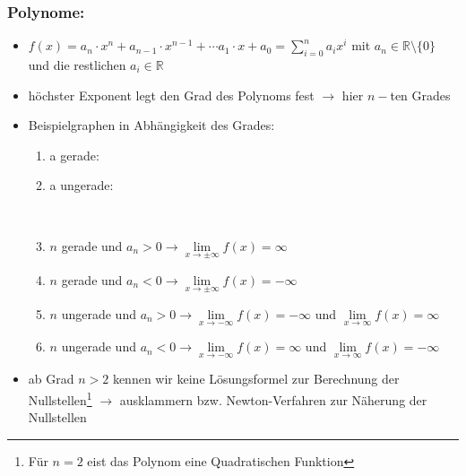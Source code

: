 \documentclass[a4paper,twocolumn,10pt]{onepgnote1}
\begin{document}
\subsubsection{Polynome:}
\begin{itemize}
\item $f(x)= a_n\cdot x^n + a_{n-1} \cdot x^{n-1} + \cdots a_1 \cdot x + a_0 =\sum\limits_{i=0}^{n} a_i x^i$ mit $a_n\in \mathds{R}\setminus \{0\}$ und die restlichen $a_{i} \in \mathds{R}$
\item höchster Exponent legt den Grad des Polynoms fest $\longrightarrow$ hier $n-$ten Grades
\item Beispielgraphen in Abhängigkeit des Grades:\\
\begin{enumerate}\item a gerade: 
\item a ungerade: \\
\item $n$ gerade und $a_n > 0 \longrightarrow \lim\limits_{x \to \pm\infty} f(x) = \infty$\\
\item $n$ gerade und $a_n <0 \longrightarrow \lim\limits_{x \to \pm\infty} f(x) =- \infty$\\
\item $n$ ungerade und $a_n > 0 \longrightarrow \lim\limits_{x \to -\infty} f(x) = -\infty$ und $ \lim\limits_{x \to \infty} f(x) = \infty$\\
\item $n$ ungerade und $a_n < 0 \longrightarrow \lim\limits_{x \to -\infty} f(x) = \infty$ und $ \lim\limits_{x \to \infty} f(x) = -\infty$
\end{enumerate}
\item ab Grad $n>2$ kennen wir keine Lösungsformel zur Berechnung der Nullstellen\footnote{Für $n=2$ eist das Polynom eine Quadratischen Funktion} $\longrightarrow$ ausklammern bzw. Newton-Verfahren zur Näherung der Nullstellen
\end{itemize}
\end{document}
